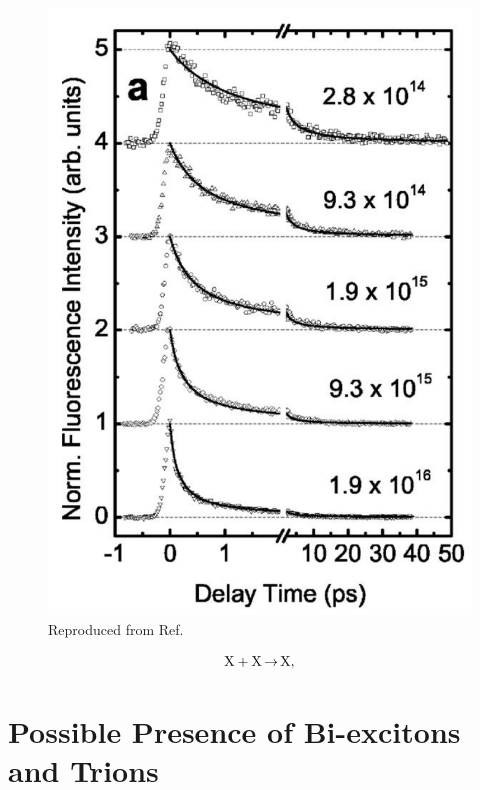 \begin{figure}[h]
	\centering
	\includegraphics[scale=0.3]{images/chapter_prior_works/pl_valkunas}
	\caption{Reproduced from Ref.\ \cite{valkunas2006exciton}}
\end{figure}

\begin{equation}
\label{eq:exc_annih}
\ce{X + X $\rightarrow$ X},
\end{equation}


\section{Possible Presence of Bi-excitons and Trions}


